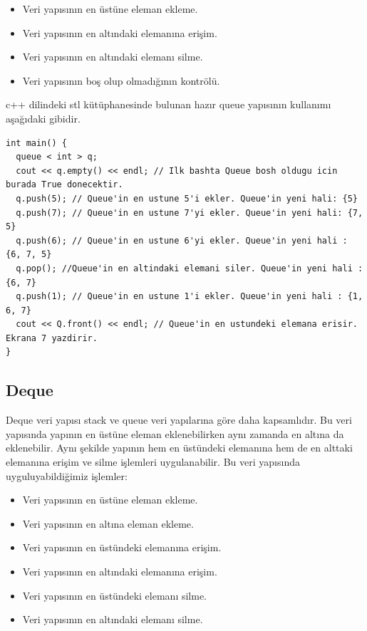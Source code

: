 \documentclass[12pt]{article}
\begin{document}
    \begin{itemize}
        \item Veri yap{\i}s{\i}n{\i}n en \"{u}st\"{u}ne eleman ekleme.
        \item Veri yap{\i}s{\i}n{\i}n en alt{\i}ndaki eleman{\i}na eri\c{s}im.
        \item Veri yap{\i}s{\i}n{\i}n en alt{\i}ndaki eleman{\i} silme.
        \item Veri yap{\i}s{\i}n{\i}n bo\c{s} olup olmad{\i}\u{g}{\i}n{\i}n kontr\"{o}l\"{u}.
    \end{itemize}
    
    c++ dilindeki stl k\"{u}t\"{u}phanesinde bulunan haz{\i}r queue yap{\i}s{\i}n{\i}n kullan{\i}m{\i} a\c{s}a\u{g}{\i}daki gibidir.
    
    \begin{verbatim}
int main() {
  queue < int > q;
  cout << q.empty() << endl; // Ilk bashta Queue bosh oldugu icin burada True donecektir.
  q.push(5); // Queue'in en ustune 5'i ekler. Queue'in yeni hali: {5}
  q.push(7); // Queue'in en ustune 7'yi ekler. Queue'in yeni hali: {7, 5}
  q.push(6); // Queue'in en ustune 6'yi ekler. Queue'in yeni hali : {6, 7, 5}
  q.pop(); //Queue'in en altindaki elemani siler. Queue'in yeni hali : {6, 7}
  q.push(1); // Queue'in en ustune 1'i ekler. Queue'in yeni hali : {1, 6, 7}
  cout << Q.front() << endl; // Queue'in en ustundeki elemana erisir. Ekrana 7 yazdirir.   
}
    \end{verbatim}
	
	\subsection{Deque}
	
	Deque veri yap{\i}s{\i} stack ve queue veri yap{\i}lar{\i}na g\"{o}re daha kapsaml{\i}d{\i}r.
    Bu veri yap{\i}s{\i}nda yap{\i}n{\i}n en \"{u}st\"{u}ne eleman eklenebilirken ayn{\i} zamanda en alt{\i}na da eklenebilir. Ayn{\i} \c{s}ekilde yap{\i}n{\i}n hem en \"{u}st\"{u}ndeki eleman{\i}na hem de en alttaki eleman{\i}na eri\c{s}im ve silme i\c{s}lemleri uygulanabilir. Bu veri yap{\i}s{\i}nda uyguluyabildi\u{g}imiz i\c{s}lemler:

    \begin{itemize}
        \item Veri yap{\i}s{\i}n{\i}n en \"{u}st\"{u}ne eleman ekleme.
        \item Veri yap{\i}s{\i}n{\i}n en alt{\i}na eleman ekleme.
        \item Veri yap{\i}s{\i}n{\i}n en \"{u}st\"{u}ndeki eleman{\i}na eri\c{s}im.
        \item Veri yap{\i}s{\i}n{\i}n en alt{\i}ndaki eleman{\i}na eri\c{s}im.
        \item Veri yap{\i}s{\i}n{\i}n en \"{u}st\"{u}ndeki eleman{\i} silme.
        \item Veri yap{\i}s{\i}n{\i}n en alt{\i}ndaki eleman{\i} silme.
    \end{itemize}
    
\end{document}
